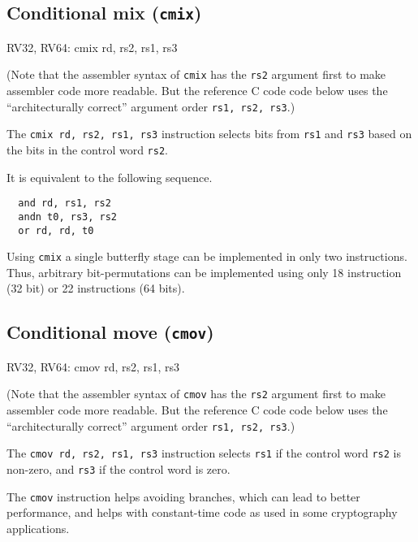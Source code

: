 \subsection{Conditional mix ({\tt cmix})}

\begin{rvb}
  RV32, RV64:
    cmix rd, rs2, rs1, rs3
\end{rvb}

(Note that the assembler syntax of {\tt cmix} has the {\tt rs2} argument first
to make assembler code more readable. But the reference C code code below uses
the ``architecturally correct'' argument order {\tt rs1, rs2, rs3}.)

The {\tt cmix rd, rs2, rs1, rs3} instruction selects bits from {\tt rs1} and {\tt rs3} based
on the bits in the control word {\tt rs2}.



It is equivalent to the following sequence.

\begin{minipage}{\linewidth}
\begin{verbatim}
  and rd, rs1, rs2
  andn t0, rs3, rs2
  or rd, rd, t0
\end{verbatim}
\end{minipage}

Using {\tt cmix} a single butterfly stage can be implemented in only two
instructions. Thus, arbitrary bit-permutations can be implemented using only
18 instruction (32 bit) or 22 instructions (64 bits).

\subsection{Conditional move ({\tt cmov})}

\begin{rvb}
  RV32, RV64:
    cmov rd, rs2, rs1, rs3
\end{rvb}

(Note that the assembler syntax of {\tt cmov} has the {\tt rs2} argument first
to make assembler code more readable. But the reference C code code below uses
the ``architecturally correct'' argument order {\tt rs1, rs2, rs3}.)

The {\tt cmov rd, rs2, rs1, rs3} instruction selects {\tt rs1} if the control
word {\tt rs2} is non-zero, and {\tt rs3} if the control word is zero.



The {\tt cmov} instruction helps avoiding branches, which can lead to better
performance, and helps with constant-time code as used in some cryptography
applications.

